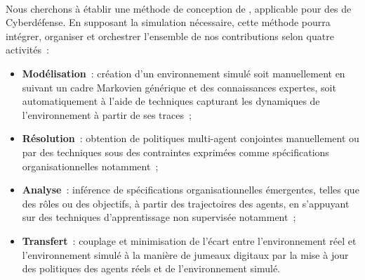 \\

\noindent
Nous cherchons à établir une méthode de conception de , applicable pour des  de Cyberdéfense. En supposant la simulation nécessaire, cette méthode pourra intégrer, organiser et orchestrer l'ensemble de nos contributions selon quatre activités~:
\begin{itemize}
    \item \textbf{Modélisation}~: création d'un environnement simulé soit manuellement en suivant un cadre Markovien générique et des connaissances expertes, soit automatiquement à l'aide de techniques  capturant les dynamiques de l'environnement à partir de ses traces~;
    \item \textbf{Résolution}~: obtention de politiques multi-agent conjointes manuellement ou par des techniques  sous des contraintes exprimées comme spécifications organisationnelles notamment~;
    \item \textbf{Analyse}~: inférence de spécifications organisationnelles émergentes, telles que des rôles ou des objectifs, à partir des trajectoires des agents, en s'appuyant sur des techniques d'apprentissage non supervisée notamment~;
    \item \textbf{Transfert}~: couplage et minimisation de l'écart entre l'environnement réel et l'environnement simulé à la manière de jumeaux digitaux par la mise à jour des politiques des agents réels et de l'environnement simulé.
\end{itemize}

